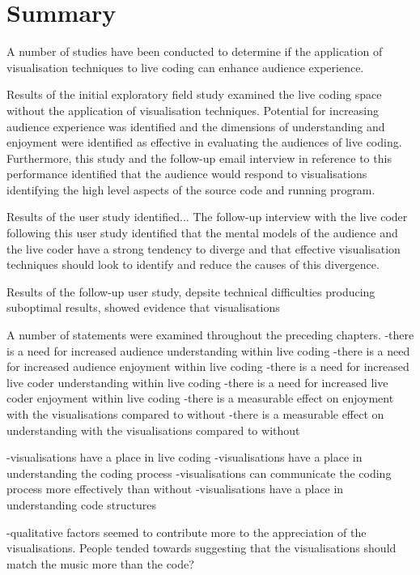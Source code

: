 
\chapter{Summary}
\label{chap:summary}

A number of studies have been conducted to determine if the application of visualisation techniques to live coding can enhance audience experience.

Results of the initial exploratory field study examined the live coding space without the application of visualisation techniques. Potential for increasing audience experience was identified and the dimensions of understanding and enjoyment were identified as effective in evaluating the audiences of live coding. Furthermore, this study and the follow-up email interview in reference to this performance identified that the audience would respond to visualisations identifying the high level aspects of the source code and running program.

Results of the user study identified...
The follow-up interview with the live coder following this user study identified that the mental models of the audience and the live coder have a strong tendency to diverge and that effective visualisation techniques should look to identify and reduce the causes of this divergence.

Results of the follow-up user study, depsite technical difficulties producing suboptimal results, showed evidence that visualisations 

A number of statements were examined throughout the preceding chapters.
-there is a need for increased audience understanding within live coding
-there is a need for increased audience enjoyment within live coding
-there is a need for increased live coder understanding within live coding
-there is a need for increased live coder enjoyment within live coding
-there is a measurable effect on enjoyment with the visualisations compared to without
-there is a measurable effect on understanding with the visualisations compared to without

-visualisations have a place in live coding
-visualisations have a place in understanding the coding process
-visualisations can communicate the coding process more effectively than without
-visualisations have a place in understanding code structures

-qualitative factors seemed to contribute more to the appreciation of the visualisations. People tended towards suggesting that the visualisations should match the music more than the code?

